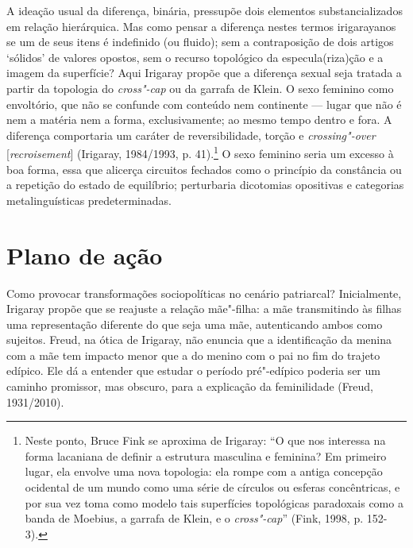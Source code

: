 A ideação usual da diferença, binária, pressupõe dois elementos
substancializados em relação hierárquica. Mas como pensar a diferença
nestes termos irigarayanos se um de seus itens é indefinido (ou fluido);
sem a contraposição de dois artigos `sólidos' de valores opostos, sem o
recurso topológico da especula(riza)ção e a imagem da superfície? Aqui
Irigaray propõe que a diferença sexual seja tratada a partir da
topologia do \emph{cross"-cap} ou da garrafa de Klein. O sexo feminino
como envoltório, que não se confunde com conteúdo nem continente ---
lugar que não é nem a matéria nem a forma, exclusivamente; ao mesmo
tempo dentro e fora. A diferença comportaria um caráter de
reversibilidade, torção e \emph{crossing"-over} {[}\emph{recroisement}{]}
(Irigaray, 1984/1993, p. 41).\footnote{Neste ponto, Bruce Fink se
  aproxima de Irigaray: ``O que nos interessa na forma lacaniana de
  definir a estrutura masculina e feminina? Em primeiro lugar, ela
  envolve uma nova topologia: ela rompe com a antiga concepção ocidental
  de um mundo como uma série de círculos ou esferas concêntricas, e por
  sua vez toma como modelo tais superfícies topológicas paradoxais como
  a banda de Moebius, a garrafa de Klein, e o \emph{cross"-cap}'' (Fink,
  1998, p. 152-3).} O sexo feminino seria um excesso à boa forma, essa
que alicerça circuitos fechados como o princípio da constância ou a
repetição do estado de equilíbrio; perturbaria dicotomias opositivas e
categorias metalinguísticas predeterminadas.

\section{Plano de ação}

Como provocar transformações sociopolíticas no cenário patriarcal?
Inicialmente, Irigaray propõe que se reajuste a relação mãe"-filha: a mãe
transmitindo às filhas uma representação diferente do que seja uma mãe,
autenticando ambos como sujeitos. Freud, na ótica de Irigaray, não
enuncia que a identificação da menina com a mãe tem impacto menor que a
do menino com o pai no fim do trajeto edípico. Ele dá a entender que
estudar o período pré"-edípico poderia ser um caminho promissor, mas
obscuro, para a explicação da feminilidade (Freud, 1931/2010).


